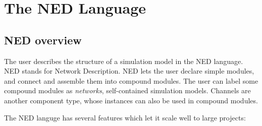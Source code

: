 \chapter{The NED Language}
\label{cha:the-ned-language}


\section{NED overview}

The user describes the structure of a simulation model in the NED language.
NED stands for Network Description. NED lets the user declare simple modules,
and connect and assemble them into compound modules. The user can label
some compound modules as \textit{networks}, self-contained simulation
models. Channels are another component type, whose instances can also be used
in compound modules.

The NED languge has several features which let it scale well to large projects:

